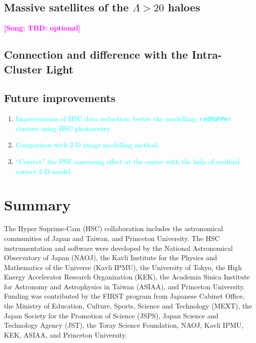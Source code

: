 \documentclass[preprint]{aastex}
\newcommand{\plan}[1]{\textcolor{cyan}{#1}}
\newcommand{\song}[1]{\textcolor{magenta}{\textbf{[Song: #1]}}}
\begin{document}
\begin{CJK*}{UTF8}{gbsn}
\subsection{Massive satellites of the $\Lambda > 20$ haloes}
\song{TBD: optional}

\subsection{Connection and difference with the Intra-Cluster Light}

\subsection{Future improvements}

    \begin{enumerate}
        \item \plan{Improvements of HSC data reduction: better sky modelling; 
            \texttt{redMaPPer} clusters using HSC photometry.}
        \item \plan{Comparison with 2-D image modelling method.}
        \item \plan{``Correct'' the PSF smeearing effect at the center with the help of 
            residual correct 2-D model.}
    \end{enumerate}


\section{Summary}


  
\acknowledgements
  
  The Hyper Suprime-Cam (HSC) collaboration includes the astronomical
  communities of Japan and Taiwan, and Princeton University.  The HSC
  instrumentation and software were developed by the National
  Astronomical Observatory of Japan (NAOJ), the Kavli Institute for the
  Physics and Mathematics of the Universe (Kavli IPMU), the University
  of Tokyo, the High Energy Accelerator Research Organization (KEK), the
  Academia Sinica Institute for Astronomy and Astrophysics in Taiwan
  (ASIAA), and Princeton University.  Funding was contributed by the FIRST 
  program from Japanese Cabinet Office, the Ministry of Education, Culture, 
  Sports, Science and Technology (MEXT), the Japan Society for the 
  Promotion of Science (JSPS),  Japan Science and Technology Agency 
  (JST),  the Toray Science  Foundation, NAOJ, Kavli IPMU, KEK, ASIAA,  
  and Princeton University.
   

\end{CJK*}
\end{document}
